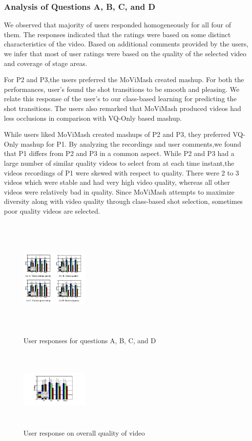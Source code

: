 \documentclass{sig-alternate}
\begin{document}
\subsubsection{ Analysis of Questions A, B, C, and D }
We observed that majority of users responded homogeneously for all four of them. The responses indicated that the ratings were based on some distinct characteristics of the video. Based on additional comments provided by the users, we infer that most of user ratings were based on the quality of the selected video and coverage of stage areas.

For P2 and P3,the users preferred the MoViMash created mashup. For both the performances, user’s found the shot transitions to be smooth and pleasing. We relate this response of the user’s to our class-based learning for predicting the shot transitions. The users also remarked that MoViMash produced videos had less occlusions in comparison with VQ-Only based mashup.

While users liked MoViMash created mashups of P2 and P3, they preferred VQ-Only mashup for P1. By analyzing the recordings and user comments,we found that P1 differs from P2 and P3 in a common aspect. While P2 and P3 had a large number of similar quality videos to select from at each time instant,the videos recordings of P1 were skewed with respect to quality. There were 2 to 3 videos which were stable and had very high video quality, whereas all other videos were relatively bad in quality. Since MoViMash attempts to maximize diversity along with video quality through class-based shot selection, sometimes poor quality videos are selected. 

\begin{figure}[!htb]
\centering
\includegraphics[width=0.3\textwidth ,height = 6cm]{image7}
\caption{User responses for questions A, B, C, and D}
\label{fig:figure7}
\end{figure}

\begin{figure}[!htb]
\centering
\includegraphics[width=0.3\textwidth ,height = 4cm]{image8}
\caption{User response on overall quality of video}
\label{fig:figure1}
\end{figure}
\end{document}
